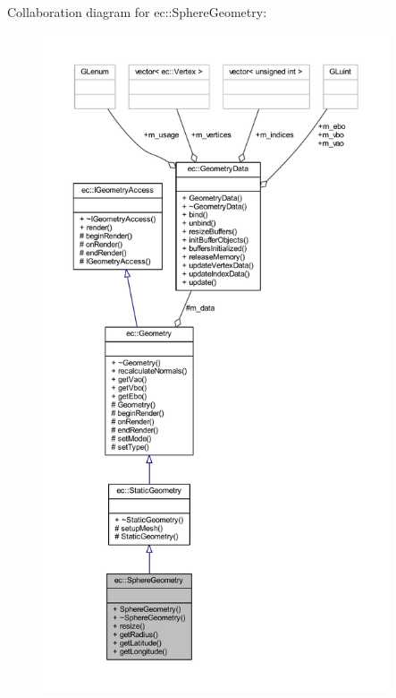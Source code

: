 Collaboration diagram for ec\+:\+:Sphere\+Geometry\+:\nopagebreak
\begin{figure}[H]
\begin{center}
\leavevmode
\includegraphics[height=550pt]{classec_1_1_sphere_geometry__coll__graph}
\end{center}
\end{figure}
